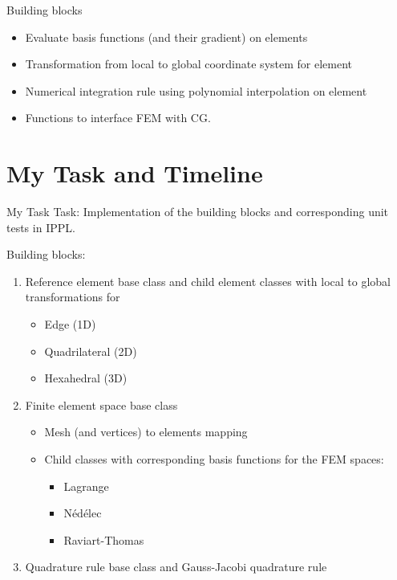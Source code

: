 \documentclass[handout,xcolor=pdftex,table,10pt,yellow,mathserif]{beamer}
\begin{document}
\begin{frame}{Building blocks}
    \begin{itemize}
        \item Evaluate basis functions (and their gradient) on elements
        \item Transformation from local to global coordinate system for element
        \item Numerical integration rule using polynomial interpolation on element
        \item Functions to interface FEM with CG.
    \end{itemize}
\end{frame}


\section{My Task and Timeline}

\begin{frame}{My Task}
    Task: Implementation of the building blocks and corresponding unit tests in IPPL.
    \vspace*{10pt}

    \pause

    Building blocks:
    \pause
    \begin{enumerate}
        \item Reference element base class and child element classes with local to global transformations for
            \begin{itemize}
                \item Edge (1D)
                \item Quadrilateral (2D)
                \item Hexahedral (3D)
            \end{itemize}

            \pause

        \item Finite element space base class
            \pause
            \begin{itemize}
                \item Mesh (and vertices) to elements mapping \pause
                \item Child classes with corresponding basis functions for the FEM spaces:
                    \begin{itemize}
                        \item Lagrange
                        \item Nédélec
                        \item Raviart-Thomas
                    \end{itemize}
            \end{itemize}    

            \pause
        
        \item Quadrature rule base class and Gauss-Jacobi quadrature rule
    \end{enumerate}
\end{frame}
\end{document}

